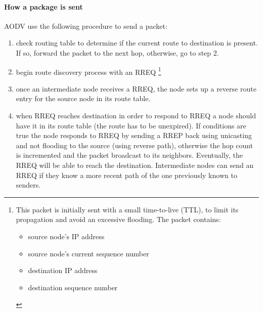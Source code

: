 \paragraph*{How a package is sent} AODV use the following procedure to send a
packet:
\begin{enumerate}
\item check routing table to determine if the current route to destination is
  present. If so, forward the packet to the next hop, otherwise, go to step 2.
\item begin route discovery process with an RREQ \footnote{
  This packet is initially sent with a small time-to-live (TTL), to limit its
  propagation and avoid an excessive flooding.
  The packet contains:
  \begin{itemize}
  \item source node's IP address
  \item source node's current sequence number
  \item destination IP address
  \item destination sequence number
  \end{itemize}
}
\item once an intermediate node receives a RREQ, the node sets up a reverse
  route entry for the source node in its route table.
\item when RREQ reaches destination in order to respond to RREQ a node should
  have it in its route table (the route has to be unexpired). If conditions are
  true the node responds to RREQ by sending a RREP back using unicasting
  and not flooding to the source (using reverse path), otherwise the hop count
  is incremented and the packet broadcast to its neighbors. Eventually, the
  RREQ will be able to reach the destination. Intermediate nodes can send an
  RREQ if they know a more recent path of the one previously known to senders.
\end{enumerate}

